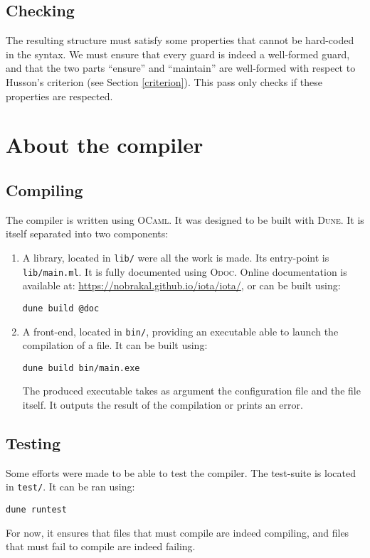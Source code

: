 \documentclass[10pt,a4paper]{article}
\newcommand\Odoc{\textsc{Odoc}}
\newcommand\Ocaml{\textsc{OCaml}}
\newcommand\Dune{\textsc{Dune}}
\begin{document}
\subsection{Checking}
\label{subsec:verification}
The resulting structure must satisfy some properties that cannot be hard-coded in the syntax. We must ensure that every guard is indeed a well-formed guard, and that the two parts ``ensure'' and ``maintain'' are well-formed with respect to Husson's criterion (see Section \ref{criterion}). This pass only checks if these properties are respected.

\section{About the compiler}
\subsection{Compiling}
The compiler is written using \Ocaml{}\cite{ocaml}. It was designed to be built with \Dune{}\cite{dune}. It is itself separated into two components:

\begin{enumerate}
\item A library, located in \verb|lib/| were all the work is made. Its entry-point is \verb|lib/main.ml|. It is fully documented using \Odoc{}\cite{odoc}. Online documentation is available at: \url{https://nobrakal.github.io/iota/iota/}, or can be built using:
\begin{verbatim}
dune build @doc
\end{verbatim}
\item A front-end, located in \verb|bin/|, providing an executable able to launch the compilation of a file. It can be built using:
\begin{verbatim}
dune build bin/main.exe
\end{verbatim}
  The produced executable takes as argument the configuration file and the file itself. It outputs the result of the compilation or prints an error.
\end{enumerate}

\subsection{Testing}
Some efforts were made to be able to test the compiler. The test-suite is located in \verb|test/|. It can be ran using:
\begin{verbatim}
dune runtest
\end{verbatim}
For now, it ensures that files that must compile are indeed compiling, and files that must fail to compile are indeed failing.
\end{document}
